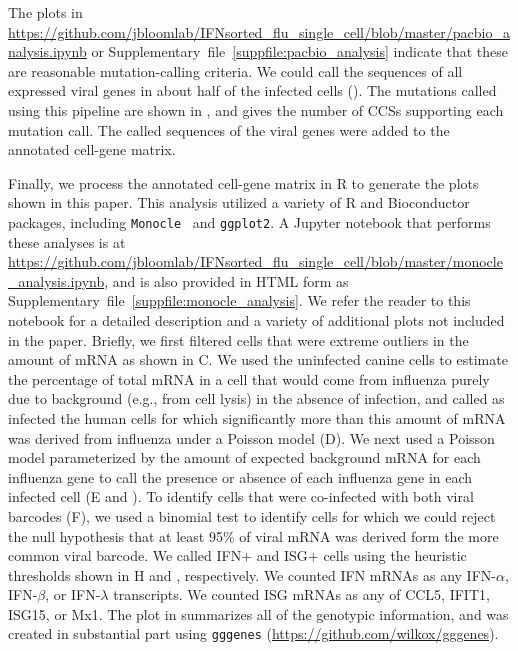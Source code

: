 \documentclass[9pt,lineno]{elife}
\begin{document}
The plots in \url{https://github.com/jbloomlab/IFNsorted_flu_single_cell/blob/master/pacbio_analysis.ipynb} or Supplementary~file~\ref{suppfile:pacbio_analysis} indicate that these are reasonable mutation-calling criteria.
We could call the sequences of all expressed viral genes in about half of the infected cells ().
The mutations called using this pipeline are shown in , and  gives the number of CCSs supporting each mutation call.
The called sequences of the viral genes were added to the annotated cell-gene matrix.

Finally, we process the annotated cell-gene matrix in R to generate the plots shown in this paper.
This analysis utilized a variety of R and Bioconductor~\citep{huber2015orchestrating} packages, including \texttt{Monocle}~\citep{qiu2017reversed, trapnell2014dynamics} and \texttt{ggplot2}.
A Jupyter notebook that performs these analyses is at \url{https://github.com/jbloomlab/IFNsorted_flu_single_cell/blob/master/monocle_analysis.ipynb}, and is also provided in HTML form as Supplementary~file~\ref{suppfile:monocle_analysis}.
We refer the reader to this notebook for a detailed description and a variety of additional plots not included in the paper.
Briefly, we first filtered cells that were extreme outliers in the amount of mRNA as shown in C.
We used the uninfected canine cells to estimate the percentage of total mRNA in a cell that would come from influenza purely due to background (e.g., from cell lysis) in the absence of infection, and called as infected the human cells for which significantly more than this amount of mRNA was derived from influenza under a Poisson model (D).
We next used a Poisson model parameterized by the amount of expected background mRNA for each influenza gene to call the presence or absence of each influenza gene in each infected cell (E and ). 
To identify cells that were co-infected with both viral barcodes (F), we used a binomial test to identify cells for which we could reject the null hypothesis that at least 95\% of viral mRNA was derived form the more common viral barcode.
We called IFN+ and ISG+ cells using the heuristic thresholds shown in H and , respectively.
We counted IFN mRNAs as any IFN-$\alpha$, IFN-$\beta$, or IFN-$\lambda$ transcripts.
We counted ISG mRNAs as any of CCL5, IFIT1, ISG15, or Mx1.
The plot in  summarizes all of the genotypic information, and was created in substantial part using \texttt{gggenes} (\url{https://github.com/wilkox/gggenes}).
\end{document}
